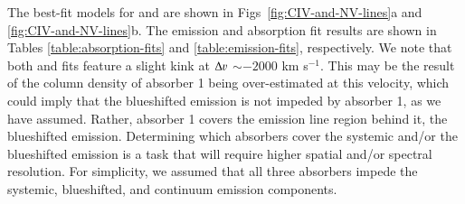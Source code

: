 The best-fit models for  and  are shown in Figs~\ref{fig:CIV-and-NV-lines}a and \ref{fig:CIV-and-NV-lines}b. The emission and absorption fit results are shown in Tables \ref{table:absorption-fits} and \ref{table:emission-fits}, respectively. We note that both  and  fits feature a slight kink at $\Delta \varv$ $\sim -2000$ km s$^{-1}.$ This may be the result of the column density of absorber 1 being over-estimated at this velocity, which could imply that the blueshifted  emission is not impeded by absorber 1, as we have assumed. Rather, absorber 1 covers the emission line region behind it, the blueshifted emission. Determining which absorbers cover the systemic and/or the blueshifted emission is a task that will require higher spatial and/or spectral resolution. For simplicity, we assumed that all three absorbers impede the systemic, blueshifted, and continuum emission components.


